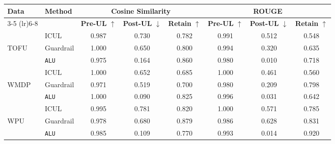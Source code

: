 \begin{table*}[]
    \centering
    \caption{Comparison of Methods using Cosine Similarity and ROUGE Metrics with phi-3-small-128k}
    \begin{tabular}{llccc|ccc}
        \toprule
        \textbf{Data}&\textbf{Method} & \multicolumn{3}{c}{\textbf{Cosine Similarity}} & \multicolumn{3}{c}{\textbf{ROUGE}} \\
        \cmidrule(lr){3-5} \cmidrule(lr){6-8}
         & & \textbf{Pre-UL} $\uparrow$ & \textbf{Post-UL} $\downarrow$ & \textbf{Retain} $\uparrow$ & \textbf{Pre-UL} $\uparrow$ & \textbf{Post-UL} $\downarrow$ & \textbf{Retain} $\uparrow$ \\
        \midrule
        &ICUL & 0.987 & 0.730 & 0.782 & 0.991 & 0.512 & 0.548 \\
        TOFU &Guardrail & 1.000 & 0.650 & 0.800 & 0.994 & 0.320 & 0.635 \\
        &\texttt{ALU}  & 0.975 & 0.164 & 0.860 & 0.980 & 0.010 & 0.718 \\
        \midrule
        &ICUL  & 1.000 & 0.652 & 0.685 & 1.000 & 0.461 & 0.560 \\
        WMDP & Guardrail  & 0.971  & 0.519 & 0.700 & 0.980 & 0.209 & 0.798 \\
        &\texttt{ALU} & 1.000  & 0.090 & 0.825 & 0.996 & 0.031 & 0.642 \\
        \midrule
        &ICUL  & 0.995 & 0.781 & 0.820 & 1.000 & 0.571 & 0.785 \\
        WPU &Guardrail & 0.978 & 0.680 & 0.879 & 0.986 & 0.628 & 0.831 \\
        &\texttt{ALU} & 0.985 & 0.109 & 0.770 & 0.993 & 0.014 & 0.920 \\
        
        \bottomrule
    \end{tabular}
\label{tab:t18}    
\end{table*}

